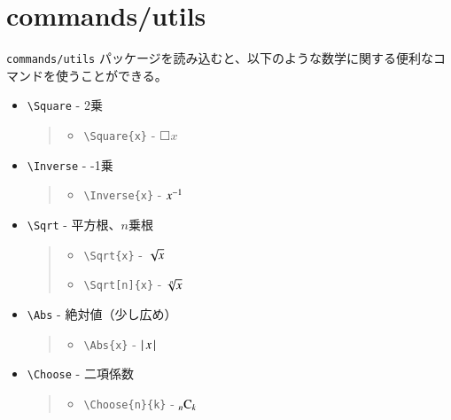 \documentclass[oneside,10pt,a4paper]{jsarticle}
\begin{document}
  \newpage

  \section{commands/utils}

  \verb|commands/utils| パッケージを読み込むと、以下のような数学に関する便利なコマンドを使うことができる。

  \begin{itemize}
    \item \verb|\Square| - 2乗
      \begin{quote}
        \Example
        \begin{itemize}
          \item \verb|\Square{x}| - $\Square{x}$
        \end{itemize}
      \end{quote}
    \item \verb|\Inverse| - -1乗
      \begin{quote}
        \Example
        \begin{itemize}
          \item \verb|\Inverse{x}| - ${x}^{-1}$
        \end{itemize}
      \end{quote}
    \item \verb|\Sqrt| - 平方根、$n$乗根
      \begin{quote}
        \Example
        \begin{itemize}
          \item \verb|\Sqrt{x}| - $\Sqrt{x}$
          \item \verb|\Sqrt[n]{x}| - $\Sqrt[n]{x}$
        \end{itemize}
      \end{quote}
    \item \verb|\Abs| - 絶対値（少し広め）
      \begin{quote}
        \Example
        \begin{itemize}
          \item \verb|\Abs{x}| - $\left| \, x \, \right|$
        \end{itemize}
      \end{quote}
    \item \verb|\Choose| - 二項係数
      \begin{quote}
        \Example
        \begin{itemize}
          \item \verb|\Choose{n}{k}| - ${}_{n} \mathrm{C}_{k}$

\end{itemize}
\end{quote}
\end{itemize}
\end{document}
